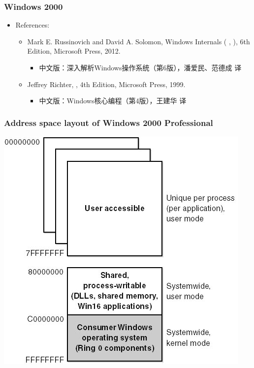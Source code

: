 \documentclass[CJKutf8,xcolor=pdftex,dvipsnames,table]{beamer}
\begin{document}
\begin{CJK*}{UTF8}{song}
  \begin{frame}
    \frametitle{Windows 2000} \pause
    \begin{itemize}
    \item{References:} \pause
      \begin{itemize}
          \item{Mark E. Russinovich and David A. Solomon, Windows Internals ( 
,
), 6th Edition, Microsoft Press, 2012.} \pause
        \begin{itemize}
        \item{中文版：深入解析Windows操作系统（第6版），潘爱民、范德成 译} \pause
        \end{itemize}
      \item{Jeffrey Richter, , 4th Edition, Microsoft Press, 1999.} \pause
        \begin{itemize}
        \item{中文版：Windows核心编程（第4版），王建华 译}
        \end{itemize}      
      \end{itemize}
    \end{itemize}
  \end{frame}
  
  \begin{frame}
    \frametitle{Address space layout of Windows 2000 Professional} \pause
    \begin{center}
      \includegraphics[scale=0.4]{2kplayout}
    \end{center}
  \end{frame}


\end{CJK*}
\end{document}
